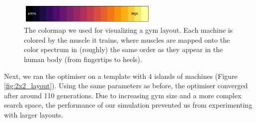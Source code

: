 \documentclass[9pt]{pnas-new}
\begin{document}
\begin{figure}[h]
	\centering
	\includegraphics[width=0.6\textwidth]{workoutTypeColormap.png}
	\caption{The colormap we used for visualizing a gym layout. Each machine is colored by the muscle it trains, where muscles are mapped onto the color spectrum in (roughly) the same order as they appear in the human body (from fingertips to heels).}\label{fig:colormap}
\end{figure}

Next, we ran the optimiser on a template with 4 islands of machines (Figure \ref{fig:2x2_layout}). Using the same parameters as before, the optimiser converged after around 110 generations. Due to increasing gym size and a more complex search space, the performance of our simulation prevented us from experimenting with larger layouts.
\end{document}
